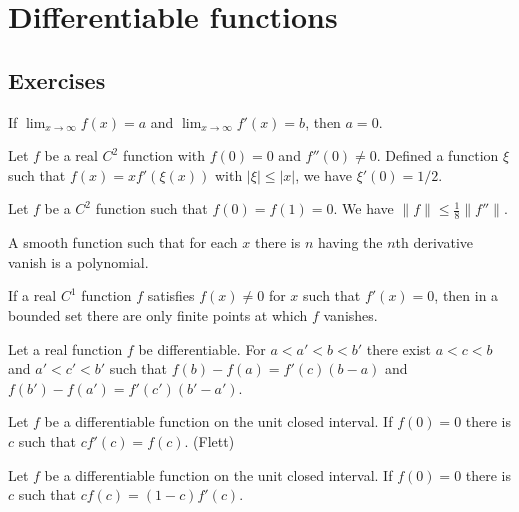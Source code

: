 \documentclass{../note}
\begin{document}
\chapter{Differentiable functions}

\section*{Exercises}

\begin{prb}
If $\lim_{x\to\infty}f(x)=a$ and $\lim_{x\to\infty}f'(x)=b$, then $a=0$.
\end{prb}

\begin{prb}
Let $f$ be a real $C^2$ function with $f(0)=0$ and $f''(0)\ne0$.
Defined a function $\xi$ such that $f(x)=xf'(\xi(x))$ with $|\xi|\le|x|$, we have $\xi'(0)=1/2$.
\end{prb}

\begin{prb}
Let $f$ be a $C^2$ function such that $f(0)=f(1)=0$.
We have $\|f\|\le\frac18\|f''\|$.
\end{prb}

\begin{prb}
A smooth function such that for each $x$ there is $n$ having the $n$th derivative vanish is a polynomial.
\end{prb}

\begin{prb}
If a real $C^1$ function $f$ satisfies $f(x)\ne0$ for $x$ such that $f'(x)=0$, then in a bounded set there are only finite points at which $f$ vanishes.
\end{prb}

\begin{prb}
Let a real function $f$ be differentiable.
For $a<a'<b<b'$ there exist $a<c<b$ and $a'<c'<b'$ such that $f(b)-f(a)=f'(c)(b-a)$ and $f(b')-f(a')=f'(c')(b'-a')$.
\end{prb}

\begin{prb}
Let $f$ be a differentiable function on the unit closed interval.
If $f(0)=0$ there is $c$ such that $cf'(c)=f(c)$. (Flett)
\end{prb}

\begin{prb}
Let $f$ be a differentiable function on the unit closed interval.
If $f(0)=0$ there is $c$ such that $cf(c)=(1-c)f'(c)$.
\end{prb}
\end{document}
